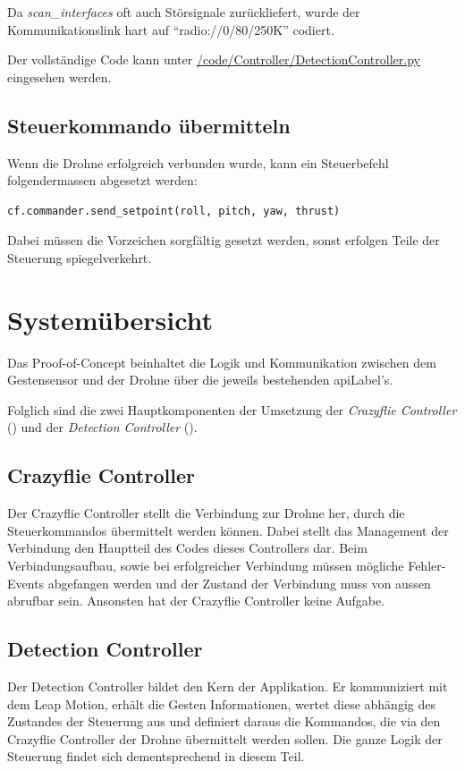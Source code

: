 Da \textit{scan\_interfaces} oft auch Störsignale zurückliefert, wurde der Kommunikationslink hart auf "`radio://0/80/250K"' codiert.

Der vollständige Code kann unter \href{https://github.com/MrJack91/droneGestures/blob/master/code/Controller/CrazyflieController.py}{/code/Controller/DetectionController.py} eingesehen werden.

\subsection{Steuerkommando übermitteln}
Wenn die Drohne erfolgreich verbunden wurde, kann ein Steuerbefehl folgendermassen abgesetzt werden:

\begin{lstlisting}[style=lstStyleCpp]
	cf.commander.send_setpoint(roll, pitch, yaw, thrust)
\end{lstlisting}

Dabei müssen die Vorzeichen sorgfältig gesetzt werden, sonst erfolgen Teile der Steuerung spiegelverkehrt.



\section{Systemübersicht}
Das Proof-of-Concept beinhaltet die Logik und Kommunikation zwischen dem Gestensensor und der Drohne über die jeweils bestehenden \gls{apiLabel}'s.

Folglich sind die zwei Hauptkomponenten der Umsetzung der \textit{Crazyflie Controller} () und der \textit{Detection Controller} ().

\subsection{Crazyflie Controller}
\label{sec:poc:controllerCrazyflie}
Der Crazyflie Controller stellt die Verbindung zur Drohne her, durch die Steuerkommandos übermittelt werden können.
Dabei stellt das Management der Verbindung den Hauptteil des Codes dieses Controllers dar.
Beim Verbindungsaufbau, sowie bei erfolgreicher Verbindung müssen mögliche Fehler-Events abgefangen werden und der Zustand der Verbindung muss von aussen abrufbar sein.
Ansonsten hat der Crazyflie Controller keine Aufgabe.

\subsection{Detection Controller}
\label{sec:poc:controllerDetection}
Der Detection Controller bildet den Kern der Applikation. Er kommuniziert mit dem Leap Motion, erhält die Gesten Informationen, wertet diese abhängig des Zustandes der Steuerung aus und definiert daraus die Kommandos, die via den Crazyflie Controller der Drohne übermittelt werden sollen.
Die ganze Logik der Steuerung findet sich dementsprechend in diesem Teil.

